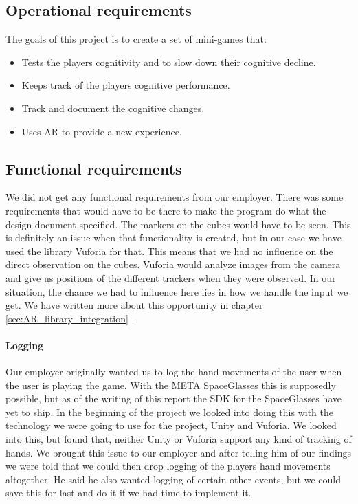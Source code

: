 \subsection{Operational requirements}
The goals of this project is to create a set of mini-games that:
\begin{itemize}
	\item Tests the players cognitivity and to slow down their cognitive decline.
	\item Keeps track of the players cognitive performance.
	\item Track and document the cognitive changes.
	\item Uses AR to provide a new experience.
\end{itemize}

\subsection{Functional requirements}
We did not get any functional requirements from our employer. There was
some requirements that would have to be there to make the program do what the
design document specified. The markers on the cubes would have to be seen. This is definitely an issue when that functionality is created, but in our case we have used the library \gls{Vuforia} for that. This means that we had no influence on the direct observation on the cubes. Vuforia would analyze images from the camera and give us positions of the different trackers when they were observed. In our situation, the chance we had to influence here lies in how we handle the input we get. We have written more about this opportunity in chapter \ref{sec:AR_library_integration} .

\paragraph{Logging}
Our employer originally wanted us to log the hand movements of the user when the user is playing the game. With the META SpaceGlasses this is supposedly possible, but as of the writing of this report the SDK for the SpaceGlasses have yet to ship. In the beginning of the project we looked into doing this with the technology we were going to use for the project, Unity and Vuforia. We looked into this, but found that, neither Unity or Vuforia support any kind of tracking of hands. We brought this issue to our employer and after telling him of our findings we were told that we could then drop logging of the players hand movements altogether. He said he also wanted logging of certain other events, but we could save this for last and do it if we had time to implement it.